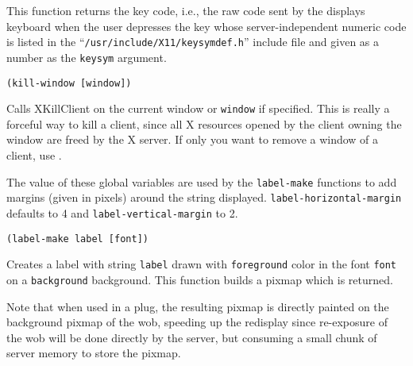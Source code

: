 This function returns the key code, i.e., the raw code sent by the displays
keyboard when the user depresses the key whose server-independent numeric
code is listed in the ``\verb"/usr/include/X11/keysymdef.h"'' include file
and given as a number as the \verb"keysym" argument.

        
{\usagefont\begin{verbatim}
(kill-window [window])
\end{verbatim}}\usageupspace

Calls XKillClient on the current window or \verb"window" if specified. This is
really a forceful way to kill a client, since all X resources opened by the
client owning the window are freed by the X server. If only you want to
remove a window of a client, use .

        

The value of these global variables are used by the \verb"label-make"
functions to add margins (given in pixels) around the string displayed.
\verb"label-horizontal-margin" defaults to 4 and
\verb"label-vertical-margin" to 2.

        
{\usagefont\begin{verbatim}
(label-make label [font])
\end{verbatim}}\usageupspace

Creates a label with string \verb"label" drawn with \verb"foreground" color
in the font \verb"font" on a \verb"background" background. This function
builds a pixmap which is returned. 

Note that when used in a plug, the resulting pixmap is directly painted on
the background pixmap of the wob, speeding up the redisplay  since
re-exposure of the wob will be done directly by the server, but consuming a
small chunk of server memory to store the pixmap.


